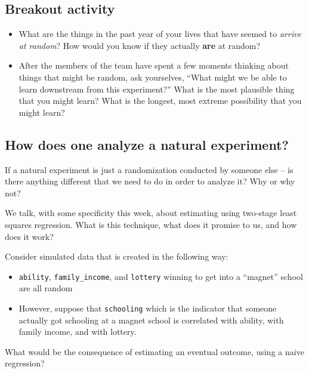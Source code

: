 \documentclass[
]{book}
\providecommand{\tightlist}{%
  \setlength{\itemsep}{0pt}\setlength{\parskip}{0pt}}
\begin{document}
\hypertarget{breakout-activity}{%
\subsection{Breakout activity}\label{breakout-activity}}

\begin{itemize}
\tightlist
\item
  What are the things in the past year of your lives that have seemed to
  \emph{arrive at random}? How would you know if they actually
  \textbf{are} at random?
\item
  After the members of the team have spent a few moments thinking about
  things that might be random, ask yourselves, ``What might we be able
  to learn downstream from this experiment?'' What is the most plausible
  thing that you might learn? What is the longest, most extreme
  possibility that you might learn?
\end{itemize}

\hypertarget{how-does-one-analyze-a-natural-experiment}{%
\subsection{How does one analyze a natural
experiment?}\label{how-does-one-analyze-a-natural-experiment}}

If a natural experiment is just a randomization conducted by someone
else -- is there anything different that we need to do in order to
analyze it? Why or why not?

We talk, with some specificity this week, about estimating using
two-stage least squares regression. What is this technique, what does it
promise to us, and how does it work?

Consider simulated data that is created in the following way:

\begin{itemize}
\tightlist
\item
  \texttt{ability}, \texttt{family\_income}, and \texttt{lottery}
  winning to get into a ``magnet'' school are all random
\item
  However, suppose that \texttt{schooling} which is the indicator that
  someone actually got schooling at a magnet school is correlated with
  ability, with family income, and with lottery.
\end{itemize}

What would be the consequence of estimating an eventual outcome, using a
naive regression?
\end{document}
